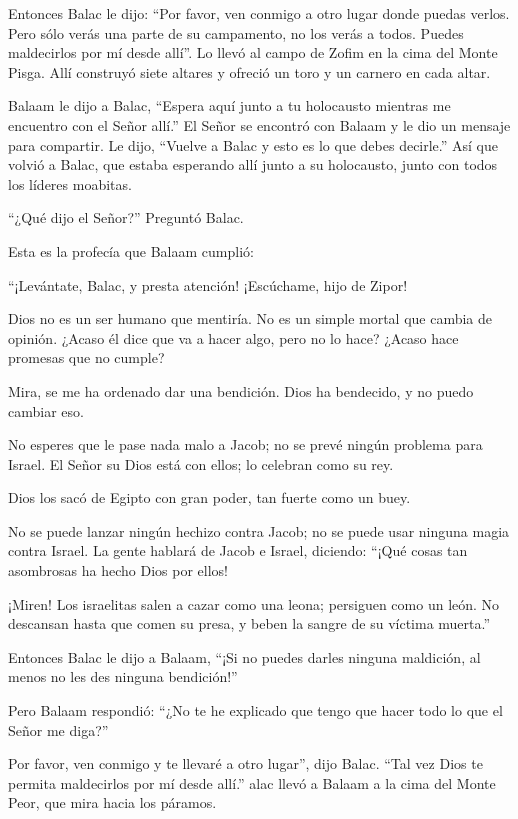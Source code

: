  Entonces Balac le dijo: ``Por favor, ven conmigo a otro
lugar donde puedas verlos. Pero sólo verás una parte de su campamento,
no los verás a todos. Puedes maldecirlos por mí desde allí''.
 Lo llevó al campo de Zofim en la cima del Monte Pisga.
Allí construyó siete altares y ofreció un toro y un carnero en cada
altar.

 Balaam le dijo a Balac, ``Espera aquí junto a tu
holocausto mientras me encuentro con el Señor allí.''  El
Señor se encontró con Balaam y le dio un mensaje para compartir. Le
dijo, ``Vuelve a Balac y esto es lo que debes decirle.'' 
Así que volvió a Balac, que estaba esperando allí junto a su holocausto,
junto con todos los líderes moabitas.

``¿Qué dijo el Señor?'' Preguntó Balac.

 Esta es la profecía que Balaam cumplió:

``¡Levántate, Balac, y presta atención! ¡Escúchame, hijo de Zipor!

 Dios no es un ser humano que mentiría. No es un simple
mortal que cambia de opinión. ¿Acaso él dice que va a hacer algo, pero
no lo hace? ¿Acaso hace promesas que no cumple?

 Mira, se me ha ordenado dar una bendición. Dios ha
bendecido, y no puedo cambiar eso.

 No esperes que le pase nada malo a Jacob; no se prevé
ningún problema para Israel. El Señor su Dios está con ellos; lo
celebran como su rey.

 Dios los sacó de Egipto con gran poder, tan fuerte como un
buey.

 No se puede lanzar ningún hechizo contra Jacob; no se
puede usar ninguna magia contra Israel. La gente hablará de Jacob e
Israel, diciendo: ``¡Qué cosas tan asombrosas ha hecho Dios por ellos!

 ¡Miren! Los israelitas salen a cazar como una leona;
persiguen como un león. No descansan hasta que comen su presa, y beben
la sangre de su víctima muerta.''

 Entonces Balac le dijo a Balaam, ``¡Si no puedes darles
ninguna maldición, al menos no les des ninguna bendición!''

 Pero Balaam respondió: ``¿No te he explicado que tengo que
hacer todo lo que el Señor me diga?''

 Por favor, ven conmigo y te llevaré a otro lugar'', dijo
Balac. ``Tal vez Dios te permita maldecirlos por mí desde allí.''
 alac llevó a Balaam a la cima del Monte Peor, que mira
hacia los páramos.

